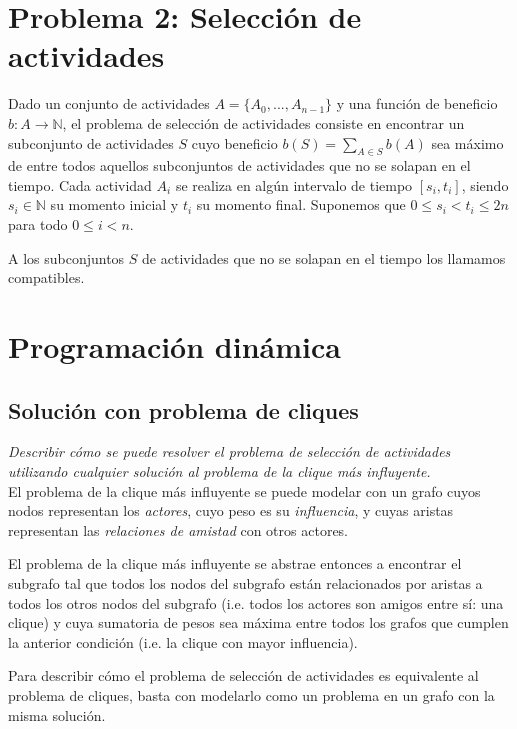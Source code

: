 \documentclass[10pt, a4paper]{article}
\begin{document}
\section*{Problema 2: Selección de actividades}
Dado un conjunto de actividades $A = \{A_0, ... , A_{n-1}\}$ y una función de beneficio $b: A \rightarrow \mathbb{N}$, el problema de selección de actividades consiste en encontrar un subconjunto de actividades $S$ cuyo beneficio $b(S) = \sum_{A \in S} b(A)$ sea máximo de entre todos aquellos subconjuntos de actividades que no se solapan en el tiempo. Cada actividad $A_i$ se realiza en algún intervalo de tiempo $[ s_i , t_i ]$, siendo $s_i \in \mathbb{N}$ su momento inicial y $t_i$ su momento final. Suponemos que $0 \leq s_i < t_i \leq 2n$ para todo $0 \leq i < n$.

A los subconjuntos $S$ de actividades que no se solapan en el tiempo los llamamos compatibles.

\section{Programación dinámica}

\subsection{Solución con problema de cliques}
\emph{Describir cómo se puede resolver el problema de selección de actividades utilizando cualquier solución al problema de la clique más influyente.} \\

El problema de la clique más influyente se puede modelar con un grafo cuyos nodos representan los \emph{actores}, cuyo peso es su \emph{influencia}, y cuyas aristas representan las \emph{relaciones de amistad} con otros actores.

El problema de la clique más influyente se abstrae entonces a encontrar el subgrafo tal que todos los nodos del subgrafo están relacionados por aristas a todos los otros nodos del subgrafo (i.e. todos los actores son amigos entre sí: una clique) y cuya sumatoria de pesos sea máxima entre todos los grafos que cumplen la anterior condición (i.e. la clique con mayor influencia).

Para describir cómo el problema de selección de actividades es equivalente al problema de cliques, basta con modelarlo como un problema en un grafo con la misma solución.
\end{document}

